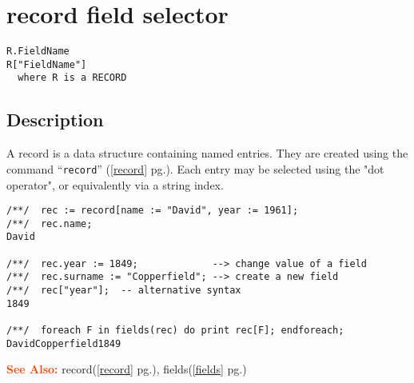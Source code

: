 \documentclass[a4paper]{mybook}
\newenvironment{command}{}{} %
\newcommand\SeeAlso{\par\textcolor{OrangeRed}{\textbf{\large See Also: }}}
\begin{document}
\section{record field selector}
\label{record field selector}
\begin{command} %


\begin{Verbatim}[label=syntax, rulecolor=\color{MidnightBlue},
frame=single]
R.FieldName
R["FieldName"]
  where R is a RECORD
\end{Verbatim}


\subsection*{Description}

A record is a data structure containing named entries.  They are created
using the command ``\verb&record&'' (\ref{record} pg.\pageref{record}).  Each entry may be selected
using the "dot operator", or equivalently via a string index.
\begin{Verbatim}[label=example, rulecolor=\color{PineGreen}, frame=single]
/**/  rec := record[name := "David", year := 1961];
/**/  rec.name;
David

/**/  rec.year := 1849;             --> change value of a field
/**/  rec.surname := "Copperfield"; --> create a new field
/**/  rec["year"];  -- alternative syntax
1849

/**/  foreach F in fields(rec) do print rec[F]; endforeach;
DavidCopperfield1849
\end{Verbatim}


\SeeAlso %
  record(\ref{record} pg.\pageref{record}), 
    fields(\ref{fields} pg.\pageref{fields})
\end{command} %
\end{document}
